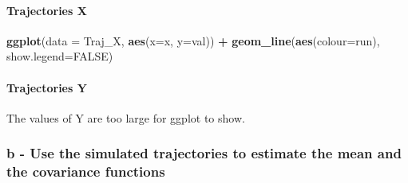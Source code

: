\documentclass[]{article}
\newenvironment{Shaded}{\begin{snugshade}}{\end{snugshade}}
\newcommand{\ControlFlowTok}[1]{\textcolor[rgb]{0.13,0.29,0.53}{\textbf{#1}}}
\newcommand{\DataTypeTok}[1]{\textcolor[rgb]{0.13,0.29,0.53}{#1}}
\newcommand{\DecValTok}[1]{\textcolor[rgb]{0.00,0.00,0.81}{#1}}
\newcommand{\KeywordTok}[1]{\textcolor[rgb]{0.13,0.29,0.53}{\textbf{#1}}}
\newcommand{\NormalTok}[1]{#1}
\newcommand{\OperatorTok}[1]{\textcolor[rgb]{0.81,0.36,0.00}{\textbf{#1}}}
\newcommand{\OtherTok}[1]{\textcolor[rgb]{0.56,0.35,0.01}{#1}}
\newcommand{\StringTok}[1]{\textcolor[rgb]{0.31,0.60,0.02}{#1}}
\let\oldparagraph\paragraph
\renewcommand{\paragraph}[1]{\oldparagraph{#1}\mbox{}}
\begin{document}
\hypertarget{trajectories-x}{%
\paragraph{Trajectories X}\label{trajectories-x}}

\begin{Shaded}
\begin{Highlighting}[]
\KeywordTok{ggplot}\NormalTok{(}\DataTypeTok{data =}\NormalTok{ Traj_X, }\KeywordTok{aes}\NormalTok{(}\DataTypeTok{x=}\NormalTok{x, }\DataTypeTok{y=}\NormalTok{val)) }\OperatorTok{+}\StringTok{ }
\StringTok{    }\KeywordTok{geom_line}\NormalTok{(}\KeywordTok{aes}\NormalTok{(}\DataTypeTok{colour=}\NormalTok{run), }\DataTypeTok{show.legend=}\OtherTok{FALSE}\NormalTok{)}
\end{Highlighting}
\end{Shaded}

\hypertarget{trajectories-y}{%
\paragraph{Trajectories Y}\label{trajectories-y}}

The values of Y are too large for ggplot to show.

\hypertarget{b---use-the-simulated-trajectories-to-estimate-the-mean-and-the-covariance-functions}{%
\subsubsection{b - Use the simulated trajectories to estimate the mean
and the covariance
functions}\label{b---use-the-simulated-trajectories-to-estimate-the-mean-and-the-covariance-functions}}

\begin{Shaded}
\end{Shaded}
\end{document}
